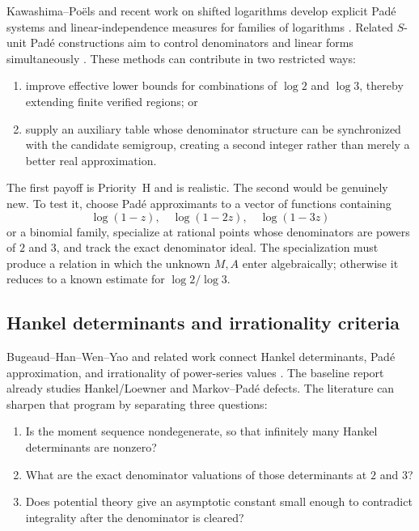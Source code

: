 \documentclass[10pt,letterpaper]{article}
\begin{document}
Kawashima--Po\"els and recent work on shifted logarithms develop explicit Pad\'e systems and
linear-independence measures for families of logarithms
\cite{KawashimaPoels,HirataKohnoMuroiWashio}.  Related \(S\)-unit Pad\'e constructions aim to
control denominators and linear forms simultaneously \cite{SUnitPade}.  These methods can
contribute in two restricted ways:

\begin{enumerate}
\item improve effective lower bounds for combinations of \(\log2\) and \(\log3\), thereby
extending finite verified regions; or
\item supply an auxiliary table whose denominator structure can be synchronized with the
candidate semigroup, creating a second integer rather than merely a better real
approximation.
\end{enumerate}

The first payoff is Priority~H and is realistic.  The second would be genuinely new.  To test
it, choose Pad\'e approximants to a vector of functions containing
\[
  \log(1-z),\quad \log(1-2z),\quad \log(1-3z)
\]
or a binomial family, specialize at rational points whose denominators are powers of \(2\)
and \(3\), and track the exact denominator ideal.  The specialization must produce a relation
in which the unknown \(M,A\) enter algebraically; otherwise it reduces to a known estimate
for \(\log2/\log3\).

\subsection{Hankel determinants and irrationality criteria}

Bugeaud--Han--Wen--Yao and related work connect Hankel determinants, Pad\'e approximation,
and irrationality of power-series values \cite{BugeaudHanWenYao}.  The baseline report
already studies Hankel/Loewner and Markov--Pad\'e defects.  The literature can sharpen that
program by separating three questions:

\begin{enumerate}
\item Is the moment sequence nondegenerate, so that infinitely many Hankel determinants are
nonzero?
\item What are the exact denominator valuations of those determinants at \(2\) and \(3\)?
\item Does potential theory give an asymptotic constant small enough to contradict
integrality after the denominator is cleared?
\end{enumerate}
\end{document}
